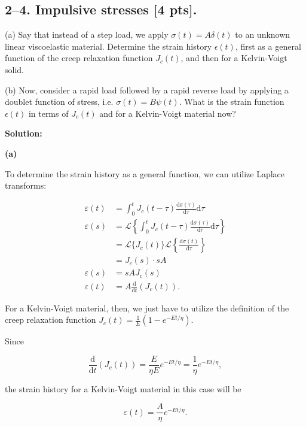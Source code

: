 \newpage
\bigskip
\subsection*{2--4. \textbf{Impulsive stresses} [4 pts].}

(a) Say that instead of a step load, we apply $\sigma(t) = A \delta(t)$ to an unknown linear viscoelastic material. 
Determine the strain history $\epsilon(t)$, first as a general function of the creep relaxation function $J_c(t)$, and then for a Kelvin-Voigt solid. 

(b) Now, consider a rapid load followed by a rapid reverse load by applying a doublet function of stress, i.e. $\sigma(t) = B \psi(t)$. 
What is the strain function $\epsilon(t)$ in terms of $J_c(t)$ and for a Kelvin-Voigt material now?

\textbf{Solution:}

\textbf{(a)}

To determine the strain history as a general function, we can utilize Laplace transforms:

\begin{align*}
    \varepsilon (t) &= \int_0^t J_c (t-\tau) \frac{\textrm{d} \sigma (\tau)}{\textrm{d} \tau} \textrm{d}\tau\\
    \varepsilon (s) &= \mathcal{L} \left\{ \int_0^t J_c (t-\tau) \frac{\textrm{d} \sigma (\tau)}{\textrm{d} \tau} \textrm{d}\tau \right\}\\
    &= \mathcal{L} \{ J_c (t)\} \mathcal{L} \left \{ \frac{\textrm{d}\sigma (t)}{\textrm{d} \tau}\right\}\\
    &= J_c (s) \cdot sA\\
    \varepsilon (s) &= sAJ_c(s)\\
    \varepsilon (t) &= A \frac{\mathrm{d}}{\mathrm{d}t} (J_c(t)).
\end{align*}

For a Kelvin-Voigt material, then, we just have to utilize the definition of the creep relaxation function $J_c (t) = \frac{1}{E} (1 - e^{-Et/\eta})$.

Since

\begin{equation*}
    \frac{\mathrm{d}}{\mathrm{d}t} (J_c(t)) = \frac{E}{\eta E} e^{- Et/\eta} = \frac{1}{\eta} e^{-Et/\eta},
\end{equation*}

the strain history for a Kelvin-Voigt material in this case will be

\begin{equation*}
    \varepsilon (t) = \frac{A}{\eta} e^{-Et/\eta}.
\end{equation*}

